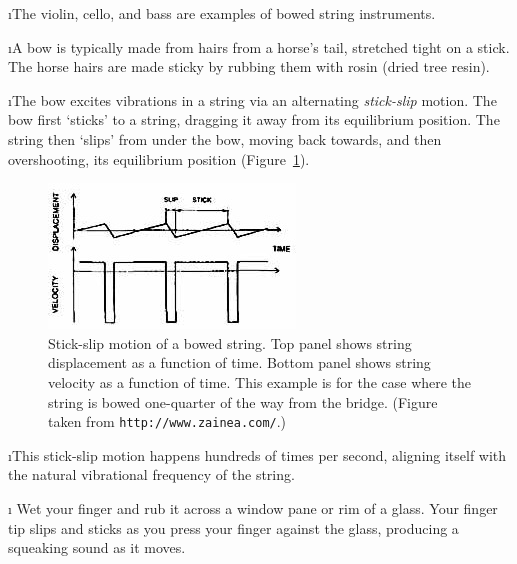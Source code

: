 \i The violin, cello, and bass are examples of bowed string
instruments.

\i A bow is typically made from hairs from a horse's tail, 
stretched tight on a stick.
The horse hairs are made sticky by rubbing them with rosin
(dried tree resin).

\i The bow excites vibrations in a string via an 
alternating {\em stick-slip} motion.
The bow first `sticks' to a string, dragging it 
away from its equilibrium position.
The string then `slips' from under the bow,
moving back towards, and then overshooting, 
its equilibrium position (Figure~\ref{f:stickslip}).
%
\begin{figure}[htbp]
\begin{center}
\includegraphics[width=.6\textwidth]{stickslip.jpg}
\caption{Stick-slip motion of a bowed string.
Top panel shows string displacement as a function of time.
Bottom panel shows string velocity as a function of time.
This example is for the case where the string is bowed
one-quarter of the way from the bridge.
(Figure taken from {\tt http://www.zainea.com/}.)}
\label{f:stickslip}
\end{center}
\end{figure}

\i This stick-slip motion happens hundreds of times per 
second, aligning itself with the natural vibrational 
frequency of the string.

\i \demo 
Wet your finger and rub it across a window pane 
or rim of a glass.
Your finger tip slips and sticks as you press 
your finger against the glass, producing a 
squeaking sound as it moves.

